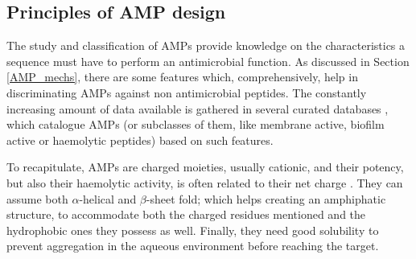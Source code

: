 \subsection{Principles of AMP design} \label{sec:amp_design}

The study and classification of AMPs provide knowledge on the characteristics a sequence must have to perform an antimicrobial function.
%
As discussed in Section \ref{AMP_mechs}, there are some features which, comprehensively, help in discriminating AMPs against non antimicrobial peptides. The constantly increasing amount of data available is gathered in several curated databases \citep{APD3,DBAASP2,dbAMP,antiBP2,amPEP}, which catalogue AMPs (or subclasses of them, like membrane active, biofilm active or haemolytic peptides) based on such features.

To recapitulate, AMPs are charged moieties, usually cationic, and their potency, but also their haemolytic activity, is often related to their net charge \citep{Jiang2011}. They can assume both $\alpha$-helical and $\beta$-sheet fold; which helps creating an amphiphatic structure, to accommodate both the charged residues mentioned and the hydrophobic ones they possess as well. Finally, they need good solubility to prevent aggregation in the aqueous environment before reaching the target.

